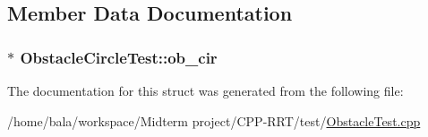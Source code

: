 \subsection{Member Data Documentation}
\subsubsection[{\texorpdfstring{ob\+\_\+cir}{ob_cir}}]{$\ast$ Obstacle\+Circle\+Test\+::ob\+\_\+cir}\hypertarget{structObstacleCircleTest_a6e3bfbeae582ed90e1d0c20f76b2156a}{}\label{structObstacleCircleTest_a6e3bfbeae582ed90e1d0c20f76b2156a}


The documentation for this struct was generated from the following file\+:\begin{DoxyCompactItemize}
\item 
/home/bala/workspace/\+Midterm project/\+C\+P\+P-\/\+R\+R\+T/test/\hyperlink{ObstacleTest_8cpp}{Obstacle\+Test.\+cpp}\end{DoxyCompactItemize}
